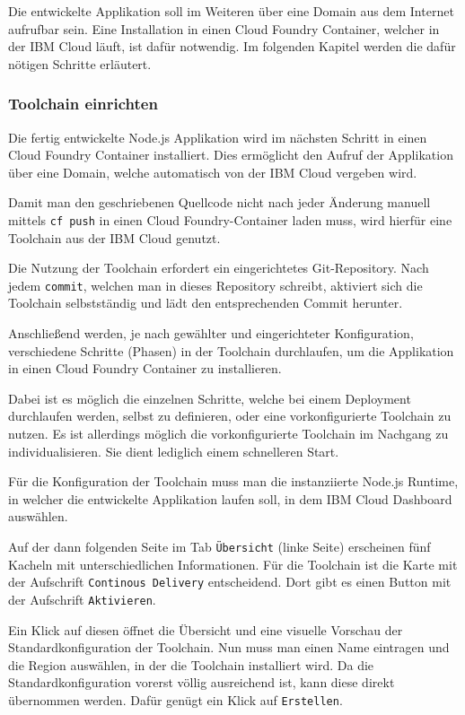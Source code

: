 Die entwickelte Applikation soll im Weiteren über eine Domain aus dem Internet aufrufbar sein. Eine Installation in
einen Cloud Foundry Container, welcher in der IBM Cloud läuft, ist dafür notwendig. Im folgenden Kapitel werden die dafür
nötigen Schritte erläutert.

\subsubsection{Toolchain einrichten}
\label{sub:tollchain_einrichten}
Die fertig entwickelte Node.js Applikation wird im nächsten Schritt in einen Cloud Foundry Container installiert. Dies
ermöglicht den Aufruf der Applikation über eine Domain, welche automatisch von der IBM Cloud vergeben wird.

Damit man den geschriebenen Quellcode nicht nach jeder Änderung manuell mittels \texttt{cf push} in einen Cloud
Foundry-Container laden muss, wird hierfür eine Toolchain aus der IBM Cloud genutzt.

Die Nutzung der Toolchain erfordert ein eingerichtetes Git-Repository. Nach jedem \texttt{commit}, welchen man in dieses
Repository schreibt, aktiviert sich die Toolchain selbstständig und lädt den entsprechenden Commit herunter.

Anschließend werden, je nach gewählter und eingerichteter Konfiguration, verschiedene Schritte (Phasen) in der Toolchain
durchlaufen, um die Applikation in einen Cloud Foundry Container zu installieren.

Dabei ist es möglich die einzelnen Schritte, welche bei einem Deployment durchlaufen werden, selbst zu definieren, oder
eine vorkonfigurierte Toolchain zu nutzen. Es ist allerdings möglich die vorkonfigurierte Toolchain im Nachgang zu
individualisieren. Sie dient lediglich einem schnelleren Start.

Für die Konfiguration der Toolchain muss man die instanziierte Node.js Runtime, in welcher die entwickelte Applikation
laufen soll, in dem IBM Cloud Dashboard auswählen.

Auf der dann folgenden Seite im Tab \texttt{Übersicht} (linke Seite) erscheinen fünf Kacheln mit unterschiedlichen
Informationen. Für die Toolchain ist die Karte mit der Aufschrift \texttt{Continous Delivery} entscheidend. Dort gibt es
einen Button mit der Aufschrift \texttt{Aktivieren}.

Ein Klick auf diesen öffnet die Übersicht und eine visuelle Vorschau der Standardkonfiguration der Toolchain. Nun muss
man einen Name eintragen und die Region auswählen, in der die Toolchain installiert wird. Da die Standardkonfiguration
vorerst völlig ausreichend ist, kann diese direkt übernommen werden. Dafür genügt ein Klick auf \texttt{Erstellen}.


